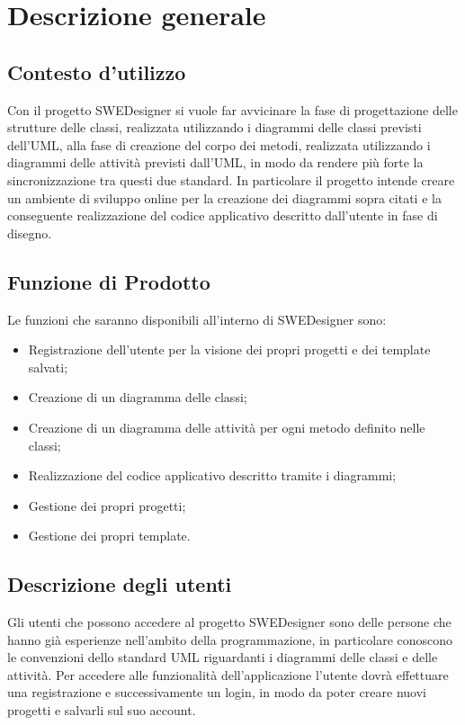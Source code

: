 \section{Descrizione generale}
\subsection{Contesto d'utilizzo}
Con il progetto SWEDesigner si vuole far avvicinare la fase di progettazione delle strutture delle classi, realizzata utilizzando i diagrammi delle classi previsti dell'UML, alla fase di creazione del corpo dei metodi, realizzata utilizzando i diagrammi delle attività previsti dall'UML, in modo da  rendere più forte la sincronizzazione tra questi due standard. In particolare il progetto intende creare un ambiente di sviluppo online per la creazione dei diagrammi sopra citati e la conseguente realizzazione del codice applicativo descritto dall'utente in fase di disegno.
 
\subsection{Funzione di Prodotto}
Le funzioni che saranno disponibili all'interno di SWEDesigner sono:
\begin{itemize}
\item Registrazione dell'utente per la visione dei propri progetti e dei template salvati; 
\item Creazione di un diagramma delle classi; 
\item Creazione di un diagramma delle attività per ogni metodo definito nelle classi;
\item Realizzazione del codice applicativo descritto tramite i diagrammi;
\item Gestione dei propri progetti;
\item Gestione dei propri template.
\end{itemize}

\subsection{Descrizione degli utenti}
Gli utenti che possono accedere al progetto SWEDesigner sono delle persone che hanno già esperienze nell'ambito della programmazione, in particolare conoscono le convenzioni dello standard UML riguardanti i diagrammi delle classi e delle attività. 
Per accedere alle funzionalità dell'applicazione l'utente dovrà effettuare una registrazione e successivamente un login, in modo da poter creare nuovi progetti e salvarli sul suo account.
